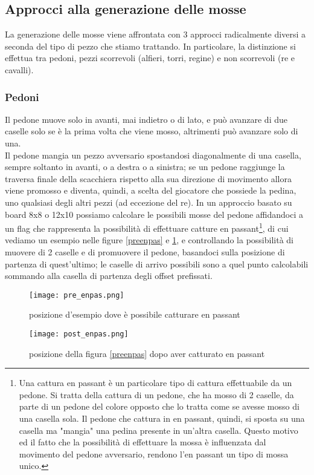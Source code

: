 \subsection{Approcci alla generazione delle mosse}
La generazione delle mosse viene affrontata con 3 approcci radicalmente diversi a seconda del tipo di pezzo che stiamo trattando. In particolare, la distinzione si effettua tra 
pedoni, pezzi scorrevoli (alfieri, torri, regine) e non scorrevoli (re e cavalli).

\subsubsection{Pedoni}
Il pedone muove solo in avanti, mai indietro o di lato, e può avanzare  di due caselle solo se è la prima volta che viene mosso, altrimenti può avanzare solo di una.
\\Il pedone mangia un pezzo avversario spostandosi diagonalmente di una casella, sempre soltanto in avanti, o a destra o a sinistra; se un pedone raggiunge la traversa finale della scacchiera rispetto alla sua direzione di movimento
allora viene promosso e diventa, quindi, a scelta del giocatore che possiede la pedina, uno qualsiasi degli altri pezzi (ad eccezione del re).
In un approccio basato su board 8x8 o 12x10 possiamo calcolare le possibili mosse del pedone affidandoci a un flag che rappresenta la possibilità di effettuare catture en passant\footnote{
Una cattura en passant è un particolare tipo di cattura effettuabile da un pedone. Si tratta della cattura di un pedone, che ha mosso di 2 caselle, da parte di un pedone del colore opposto che lo tratta come se avesse mosso di una casella sola. Il pedone che cattura in en passant, quindi, si sposta su una casella ma "mangia" una pedina presente in un'altra casella. Questo motivo ed il fatto che la possibilità di effettuare la mossa è influenzata dal movimento del pedone avversario, rendono l'en passant un tipo di mossa unico.}, di cui vediamo un esempio
nelle figure \ref{preenpas} e \ref{postenpas}, e controllando la possibilità 
di muovere di 2 caselle e di promuovere il pedone, basandoci sulla posizione di partenza di quest'ultimo; le caselle di arrivo possibili sono a quel punto calcolabili sommando alla casella di partenza degli offset prefissati.


\begin{figure}
    \centering
    \begin{minipage}{0.45\textwidth}
        \centering
        \texttt{[image: pre\_enpas.png]} %
        \caption{posizione d'esempio dove è possibile catturare en passant}
        \label{preenpas}

    \end{minipage}\hfill
    \begin{minipage}{0.45\textwidth}
        \centering
        \texttt{[image: post\_enpas.png]} %
        \caption{posizione della figura \ref{preenpas} dopo aver catturato en passant }
        \label{postenpas}
    \end{minipage}
\end{figure}





